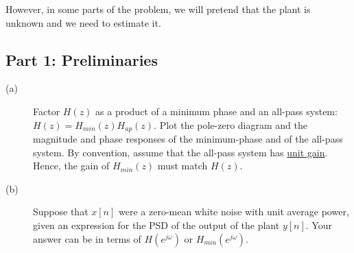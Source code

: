 \documentclass[12pt]{report}
\begin{document}
However, in some parts of the problem, we will pretend that the plant is unknown and we need to estimate it. 

\subsection*{Part 1: Preliminaries}
\begin{description}
	\item [(a)] Factor $H(z)$ as a product of a minimum phase and an all-pass system: $H(z) = H_{min}(z)H_{ap}(z)$. Plot the pole-zero diagram and the magnitude and phase responses of the minimum-phase and of the all-pass system. By convention, assume that the all-pass system has \underline{unit gain}. Hence, the gain of $H_{min}(z)$ must match $H(z)$.
	\item [(b)] Suppose that $x[n]$ were a zero-mean white noise with unit average power, given an expression for the PSD of the output of the plant $y[n]$. Your answer can be in terms of $H(e^{j\omega})$ or $H_{min}(e^{j\omega})$.
\end{description}
\end{document}
